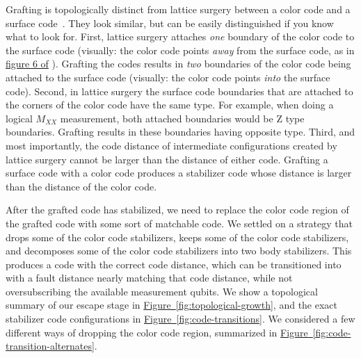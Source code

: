 \documentclass[onecolumn,unpublished,a4paper]{quantumarticle}
\theoremstyle{definition}
\newcommand{\fig}[1]{\hyperref[fig:#1]{Figure~\ref*{fig:#1}}}
\begin{document}
Grafting is topologically distinct from lattice surgery between a color code and a surface code~\cite{poulsennautrup2017,shutty2022mergedcolorcode}.
They look similar, but can be easily distinguished if you know what to look for.
First, lattice surgery attaches \emph{one} boundary of the color code to the surface code (visually: the color code points \emph{away} from the surface code, as in \href{
    https://journals.aps.org/prapplied/pdf/10.1103/PhysRevApplied.18.014072#page=17
}{figure 6 of} \cite{shutty2022mergedcolorcode}).
Grafting the codes results in \emph{two} boundaries of the color code being attached to the surface code (visually: the color code points \emph{into} the surface code).
Second, in lattice surgery the surface code boundaries that are attached to the corners of the color code have the same type.
For example, when doing a logical $M_{XX}$ measurement, both attached boundaries would be Z type boundaries.
Grafting results in these boundaries having opposite type.
Third, and most importantly, the code distance of intermediate configurations created by lattice surgery cannot be larger than the distance of either code.
Grafting a surface code with a color code produces a stabilizer code whose distance is larger than the distance of the color code.

After the grafted code has stabilized, we need to replace the color code region of the grafted code with some sort of matchable code.
We settled on a strategy that drops some of the color code stabilizers, keeps some of the color code stabilizers, and decomposes some of the color code stabilizers into two body stabilizers.
This produces a code with the correct code distance, which can be transitioned into with a fault distance nearly matching that code distance, while not oversubscribing the available measurement qubits.
We show a topological summary of our escape stage in \fig{topological-growth}, and the exact stabilizer code configurations in \fig{code-transitions}.
We considered a few different ways of dropping the color code region, summarized in \fig{code-transition-alternates}.
\end{document}
